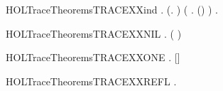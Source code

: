 \newcommand{\HOLTraceTheoremsTRACEXXcasesXXtwice}{\UseVerbatim{HOLTraceTheoremsTRACEXXcasesXXtwice}}
\begin{SaveVerbatim}{HOLTraceTheoremsTRACEXXind}
\HOLTokenTurnstile{} \HOLSymConst{\HOLTokenForall{}}.
       (\HOLSymConst{\HOLTokenForall{}}.   \HOLConst{\ensuremath{\epsilon}} ) \HOLSymConst{\HOLTokenConj{}}
       (\HOLSymConst{\HOLTokenForall{}}    .  \HOLTokenTransBegin{}\HOLTokenTransEnd {} \HOLSymConst{\HOLTokenConj{}}     \HOLSymConst{\HOLTokenImp{}}   (\HOLSymConst{::}) ) \HOLSymConst{\HOLTokenImp{}}
       \HOLSymConst{\HOLTokenForall{}}  .     \HOLSymConst{\HOLTokenImp{}}    
\end{SaveVerbatim}
\newcommand{\HOLTraceTheoremsTRACEXXind}{\UseVerbatim{HOLTraceTheoremsTRACEXXind}}
\begin{SaveVerbatim}{HOLTraceTheoremsTRACEXXNIL}
\HOLTokenTurnstile{} \HOLSymConst{\HOLTokenForall{}} .   \HOLConst{\ensuremath{\epsilon}}  \HOLSymConst{\HOLTokenEquiv{}} ( \HOLSymConst{=} )
\end{SaveVerbatim}
\newcommand{\HOLTraceTheoremsTRACEXXNIL}{\UseVerbatim{HOLTraceTheoremsTRACEXXNIL}}
\begin{SaveVerbatim}{HOLTraceTheoremsTRACEXXONE}
\HOLTokenTurnstile{} \HOLSymConst{\HOLTokenForall{}}  .   []  \HOLSymConst{\HOLTokenEquiv{}}  \HOLTokenTransBegin{}\HOLTokenTransEnd {}
\end{SaveVerbatim}
\newcommand{\HOLTraceTheoremsTRACEXXONE}{\UseVerbatim{HOLTraceTheoremsTRACEXXONE}}
\begin{SaveVerbatim}{HOLTraceTheoremsTRACEXXREFL}
\HOLTokenTurnstile{} \HOLSymConst{\HOLTokenForall{}}.   \HOLConst{\ensuremath{\epsilon}} 
\end{SaveVerbatim}
\newcommand{\HOLTraceTheoremsTRACEXXREFL}{\UseVerbatim{HOLTraceTheoremsTRACEXXREFL}}
